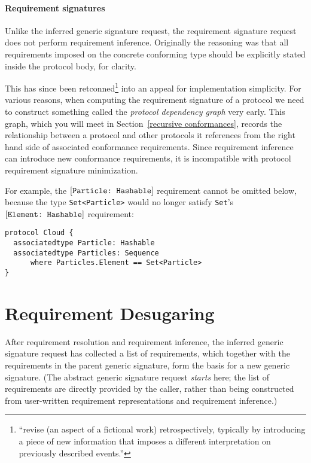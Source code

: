 \documentclass[../generics]{subfiles}
\begin{document}
\paragraph{Requirement signatures}
Unlike the inferred generic signature request, the requirement signature request does not perform requirement inference. Originally the reasoning was that all requirements imposed on the concrete conforming type should be explicitly stated inside the protocol body, for clarity.

This has since been retconned\footnote{``revise (an aspect of a fictional work) retrospectively, typically by introducing a piece of new information that imposes a different interpretation on previously described events.''} into an appeal for implementation simplicity. For various reasons, when computing the requirement signature of a protocol we need to construct something called the \emph{protocol dependency graph} very early. This graph, which you will meet in Section~\ref{recursive conformances}, records the relationship between a protocol and other protocols it references from the right hand side of associated conformance requirements. Since requirement inference can introduce new conformance requirements, it is incompatible with protocol requirement signature minimization.

For example, the $[\texttt{Particle:~Hashable}]$ requirement cannot 
be omitted below, because the type \texttt{Set<Particle>} would no longer satisfy \texttt{Set}'s $[\texttt{Element:~Hashable}]$ requirement:
\begin{Verbatim}
protocol Cloud {
  associatedtype Particle: Hashable
  associatedtype Particles: Sequence
      where Particles.Element == Set<Particle>
}
\end{Verbatim}

\section{Requirement Desugaring}\label{requirement desugaring}

After requirement resolution and requirement inference, the inferred generic signature request has collected a list of requirements, which together with the requirements in the parent generic signature, form the basis for a new generic signature. (The abstract generic signature request \emph{starts} here; the list of requirements are directly provided by the caller, rather than being constructed from user-written requirement representations and requirement inference.)
\end{document}
